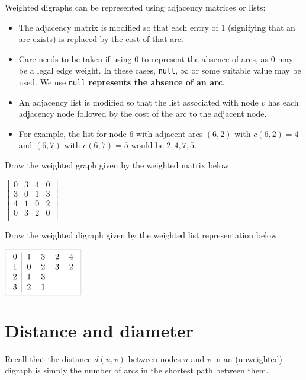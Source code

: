 Weighted digraphs can be represented using adjacency matrices or lists:
\begin{itemize}
  \item The adjacency matrix is modified so that each entry of $1$ (signifying that an arc exists) 
  is replaced by the cost of that arc.
  \item Care needs to be taken if using 0 to represent the absence of arcs, as 0 may be a legal edge weight. 
  In these cases, \texttt{null}, $\infty$ or some suitable value may be used.
  We use  \texttt{null} \textbf{represents the absence of an arc}. 
  \item An adjacency list is modified so that the list associated  with node $v$ has each adjacency node followed by the cost of the arc to the adjacent node. 
  \item For example, the list for node 6 with adjacent arcs $(6,2)$ with $c(6,2) = 4$ and $(6,7)$ with $c(6,7) = 5$ would be $2,4,7,5$.
\end{itemize}

\begin{Boxample}[1] \label{ex:drawWeightedGraph}
Draw the weighted graph given by the weighted matrix below. 
\newline

$\left[
\begin{array}{cccc}
	0 & 3 & 4 & 0  \\
	3 & 0 & 1 & 3  \\
	4 & 1 & 0 & 2  \\
	0 & 3 & 2 & 0  \\
\end{array}
\right]$
\vspace{1cm}


Draw the weighted digraph given by the weighted list representation below.
\newline

$\AdjLists{
\begin{tabular}{c|llll}
	0 & 1 & 3 & 2 & 4 \\
	1 & 0 & 2 & 3 & 2 \\
	2 & 1 & 3 &   &   \\
	3 & 2 & 1 &   &   \\
\end{tabular}
}$
\end{Boxample}


\section{Distance and diameter} \label{sec:unweighted}
Recall that the distance $d(u,v)$ between nodes $u$ and $v$ in an (unweighted) digraph 
is simply the number of arcs in the shortest path between them. 

